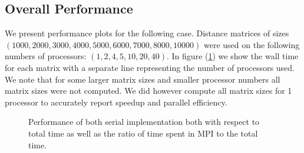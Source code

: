\documentclass[letterpaper,12pt]{article}
\begin{document}
\subsection{Overall Performance}
We present performance plots for the following case. Distance matrices
of sizes $(1000, 2000, 3000, 4000, 5000, 6000, 7000, 8000, 10000)$ were
used on the following numbers of processors: $(1, 2, 4, 5, 10, 20,
40)$. In figure (\ref{fig:performance}) we show the wall time for each
matrix with a separate line representing the number of processors
used. We note that for some larger matrix sizes and smaller processor
numbers all matrix sizes were not computed. We did however compute all
matrix sizes for 1 processor to accurately report speedup and parallel
efficiency.
\begin{figure}[!ht]
  \centering 
  \hspace{0.3in}%
  \caption{Performance of both serial implementation both with respect
    to total time as well as the ratio of time spent in MPI to the total
    time.}
  \label{fig:performance}
\end{figure}
\end{document}
